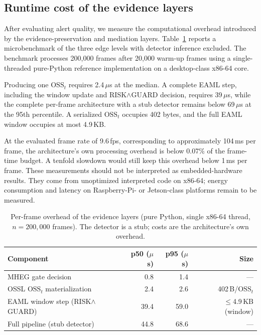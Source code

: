 \documentclass[conference]{IEEEtran}
\newcommand{\osst}{\mathrm{OSS}_t}
\begin{document}
\subsection{Runtime cost of the evidence layers}
\label{sec:cost}

After evaluating alert quality, we measure the computational overhead
introduced by the evidence-preservation and mediation layers.
Table~\ref{tab:cost} reports a microbenchmark of the three edge levels
with detector inference excluded. The benchmark processes 200{,}000
frames after 20{,}000 warm-up frames using a single-threaded pure-Python
reference implementation on a desktop-class x86-64 core.

Producing one $\osst$ requires 2.4\,$\mu$s at the median. A complete EAML
step, including the window update and RISK$\wedge$GUARD decision, requires
39\,$\mu$s, while the complete per-frame architecture with a stub
detector remains below 69\,$\mu$s at the 95th percentile. A serialized
$\osst$ occupies 402 bytes, and the full EAML window occupies at most
4.9\,KB.

At the evaluated frame rate of 9.6\,fps, corresponding to approximately
104\,ms per frame, the architecture's own processing overhead is below
0.07\% of the frame-time budget. A tenfold slowdown would still keep this
overhead below 1\,ms per frame. These measurements should not be
interpreted as embedded-hardware results. They come from unoptimized
interpreted code on x86-64; energy consumption and latency on
Raspberry-Pi- or Jetson-class platforms remain to be measured.

\begin{table}[!t]
\caption{Per-frame overhead of the evidence layers (pure Python, single
x86-64 thread, $n{=}200{,}000$ frames). The detector is a stub; costs are
the architecture's own overhead.}
\label{tab:cost}
\centering\scriptsize
\setlength{\tabcolsep}{5pt}
\begin{tabular}{@{}lrrr@{}}
\toprule
Component & p50 ($\mu$s) & p95 ($\mu$s) & Size\\
\midrule
MHEG gate decision & 0.8 & 1.4 & ---\\
OSSL $\osst$ materialization & 2.4 & 2.6 & 402\,B/$\osst$\\
EAML window step (RISK$\wedge$GUARD) & 39.4 & 59.0 &
$\leq$4.9\,KB (window)\\
Full pipeline (stub detector) & 44.8 & 68.6 & ---\\
\bottomrule
\end{tabular}
\end{table}
\end{document}
